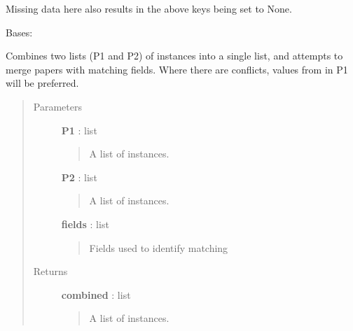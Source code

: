 \documentclass[letterpaper,10pt,english]{sphinxmanual}
\begin{document}
Missing data here also results in the above keys being set to None.

\begin{fulllineitems}
\label{tethne.readers:tethne.readers.DataError}
Bases: 

\end{fulllineitems}


\begin{fulllineitems}
\label{tethne.readers:tethne.readers.merge}
Combines two lists (P1 and P2) of {\hyperref[tethne:tethne.data.Paper]{}} instances into a single
list, and attempts to merge papers with matching fields. Where there are
conflicts, values from {\hyperref[tethne:tethne.data.Paper]{}} in P1 will be preferred.
\begin{quote}\begin{description}
\item[{Parameters }] \leavevmode
\textbf{P1} : list
\begin{quote}

A list of {\hyperref[tethne:tethne.data.Paper]{}} instances.
\end{quote}

\textbf{P2} : list
\begin{quote}

A list of {\hyperref[tethne:tethne.data.Paper]{}} instances.
\end{quote}

\textbf{fields} : list
\begin{quote}

Fields used to identify matching {\hyperref[tethne:tethne.data.Paper]{}}
\end{quote}

\item[{Returns }] \leavevmode
\textbf{combined} : list
\begin{quote}

A list of {\hyperref[tethne:tethne.data.Paper]{}} instances.
\end{quote}

\end{description}\end{quote}

\end{fulllineitems}
\end{document}
